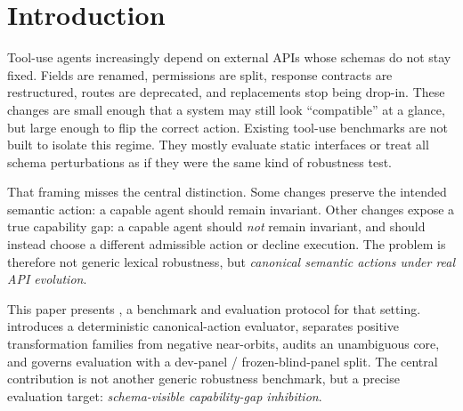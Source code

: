 \section{Introduction}

Tool-use agents increasingly depend on external APIs whose schemas do not stay fixed. Fields are renamed, permissions are split, response contracts are restructured, routes are deprecated, and replacements stop being drop-in. These changes are small enough that a system may still look ``compatible'' at a glance, but large enough to flip the correct action. Existing tool-use benchmarks are not built to isolate this regime. They mostly evaluate static interfaces or treat all schema perturbations as if they were the same kind of robustness test.

That framing misses the central distinction. Some changes preserve the intended semantic action: a capable agent should remain invariant. Other changes expose a true capability gap: a capable agent should \emph{not} remain invariant, and should instead choose a different admissible action or decline execution. The problem is therefore not generic lexical robustness, but \emph{canonical semantic actions under real API evolution}.

This paper presents \toolshift, a benchmark and evaluation protocol for that setting. \toolshift{} introduces a deterministic canonical-action evaluator, separates positive transformation families from negative near-orbits, audits an unambiguous core, and governs evaluation with a dev-panel / frozen-blind-panel split. The central contribution is not another generic robustness benchmark, but a precise evaluation target: \emph{schema-visible capability-gap inhibition}.


